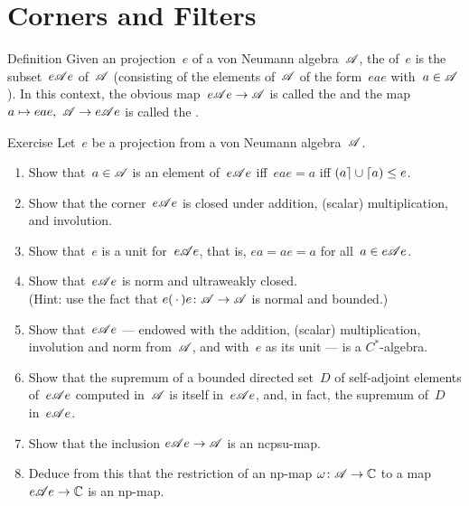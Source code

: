 \documentclass[a]{subfiles}
\begin{document}
\section{Corners and Filters}
\begin{parsec}%
\begin{point}{Definition}%
Given an projection~$e$ of a von Neumann algebra~$\mathscr{A}$,
the  of~$e$
is the subset~$e\mathscr{A} e$ of~$\mathscr{A}$ 
(consisting of the elements of~$\mathscr{A}$
of the form~$eae$ with~$a\in\mathscr{A}$).
In this context,
the obvious map~$e\mathscr{A} e\to\mathscr{A}$
is called the 
and the map $a\mapsto eae,\ \scrA\to e\scrA e$
is called the .
\end{point}
\begin{point}{Exercise}%
Let~$e$ be a projection from a von Neumann algebra~$\mathscr{A}$.
\begin{enumerate}
\item
Show that~$a\in\mathscr{A}$ 
is an element of~$e\mathscr{A} e$ iff~$eae=a$
iff $\left(a\right\rceil\cup\left\lceil a\right) \leq e$.
\item
Show that the corner~$e\mathscr{A} e$
is closed under addition, (scalar) multiplication,
and involution.
\item
Show that~$e$ is a unit for~$e\mathscr{A} e$,
that is, $ea=ae=a$ for all~$a\in e\mathscr{A} e$.
\item
Show that~$e\mathscr{A} e$ is norm and ultraweakly closed.\\
(Hint: use the fact that $e(\,\cdot\,)e\colon \mathscr{A}\to\mathscr{A}$
is normal and bounded.)
\item
Show that~$e\mathscr{A} e$ --- 
endowed with the addition, (scalar) multiplication,
involution and norm from~$\mathscr{A}$,
and with~$e$ as its unit ---  is a $C^*$-algebra.
\item
Show that the supremum of a bounded directed
set~$D$ of self-adjoint elements of~$e\mathscr{A} e$
computed in~$\mathscr{A}$
is itself in~$e\mathscr{A} e$,
and, in fact, the supremum of~$D$ in~$e\mathscr{A} e$.
\item
Show that the inclusion $e\mathscr{A} e\to\mathscr{A}$
is an ncpsu-map.
\item
Deduce from this that the restriction of an np-map
$\omega\colon \mathscr{A}\to\mathbb{C}$ to
a map $e\mathscr{A} e\to\mathbb{C}$
is an np-map.


\end{enumerate}
\end{point}
\end{parsec}
\end{document}
